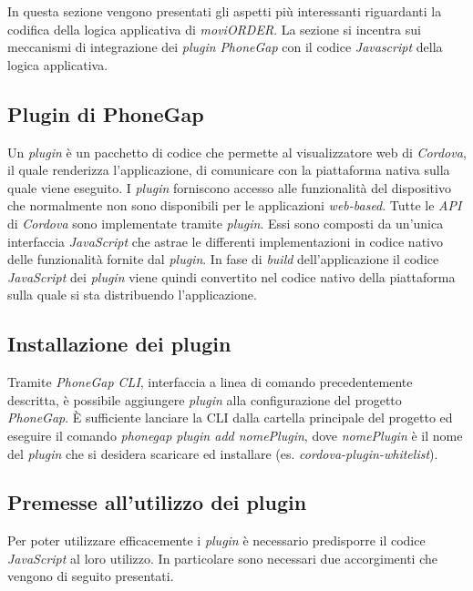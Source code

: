 In questa sezione vengono presentati gli aspetti più interessanti riguardanti la codifica della logica applicativa di \textit{moviORDER}. La sezione si incentra sui meccanismi di integrazione dei \textit{plugin} \textit{PhoneGap} con il codice \textit{Javascript} della logica applicativa.

\subsection{Plugin di PhoneGap}

Un \textit{plugin} è un pacchetto di codice che permette al visualizzatore web di \textit{Cordova}, il quale renderizza l'applicazione, di comunicare con la piattaforma nativa sulla quale viene eseguito. I \textit{plugin} forniscono accesso alle funzionalità del dispositivo che normalmente non sono disponibili per le applicazioni \textit{web-based}. Tutte le \textit{API} di \textit{Cordova} sono implementate tramite \textit{plugin}. Essi sono composti da un'unica interfaccia \textit{JavaScript} che astrae le differenti implementazioni in codice nativo delle funzionalità fornite dal \textit{plugin}. In fase di \textit{build} dell'applicazione il codice \textit{JavaScript} dei \textit{plugin} viene quindi convertito nel codice nativo della piattaforma sulla quale si sta distribuendo l'applicazione.

\subsection{Installazione dei plugin}

Tramite \textit{PhoneGap CLI}, interfaccia a linea di comando precedentemente descritta, è possibile aggiungere \textit{plugin} alla configurazione del progetto \textit{PhoneGap}. È sufficiente lanciare la CLI dalla cartella principale del progetto ed eseguire il comando \textit{phonegap plugin add nomePlugin}, dove \textit{nomePlugin} è il nome del \textit{plugin} che si desidera scaricare ed installare (es. \textit{cordova-plugin-whitelist}).

\subsection{Premesse all'utilizzo dei plugin}

Per poter utilizzare efficacemente i \textit{plugin} è necessario predisporre il codice \textit{JavaScript} al loro utilizzo. In particolare sono necessari due accorgimenti che vengono di seguito presentati.

